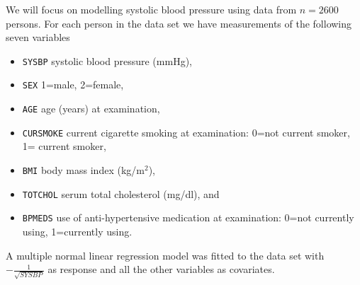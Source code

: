 \documentclass[
  ignorenonframetext,
]{beamer}
\begin{document}
\begin{frame}[fragile]
We will focus on modelling systolic blood pressure using data from
\(n=2600\) persons. For each person in the data set we have measurements
of the following seven variables

\begin{itemize}
\item
  \texttt{SYSBP} systolic blood pressure (mmHg),
\item
  \texttt{SEX} 1=male, 2=female,
\item
  \texttt{AGE} age (years) at examination,
\item
  \texttt{CURSMOKE} current cigarette smoking at examination: 0=not
  current smoker, 1= current smoker,
\item
  \texttt{BMI} body mass index (kg/m\(^2\)),
\item
  \texttt{TOTCHOL} serum total cholesterol (mg/dl), and
\item
  \texttt{BPMEDS} use of anti-hypertensive medication at examination:
  0=not currently using, 1=currently using.
\end{itemize}

A multiple normal linear regression model was fitted to the data set
with \(-\frac{1}{\sqrt{SYSBP}}\) as response and all the other variables
as covariates.
\end{frame}
\end{document}
